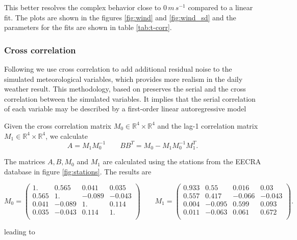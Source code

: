 \begin{refsection}
This better resolves the complex behavior close to $0\,\unit{m}\,\unit{s}^{-1}$ compared to a linear fit. The plots are shown in the figures \ref{fig:wind} and \ref{fig:wind_sd} and the parameters for the fits are shown in table \ref{tab:t-corr}.

\subsubsection{Cross correlation} \label{sec:corr}
Following \cite{Richardson1981} we use cross correlation to add additional residual noise to the simulated meteorological variables, which provides more realism in the daily weather result. This methodology, based on \cite{Matalas1967} preserves the serial and the cross correlation between the simulated variables. It implies that the serial correlation of each
variable may be described by a first-order linear autoregressive model

Given the cross correlation matrix $M_0\in\mathbb{R}^4\times\mathbb{R}^4$ and the lag-1 correlation matrix $M_1 \in\mathbb{R}^4\times\mathbb{R}^4$, we calculate 
\begin{equation}
A = M_1M_0^{-1} \qquad BB^T = M_0 - M_1M_0^{-1}M_1^T.
\end{equation}

The matrices $A, B, M_0$ and $M_1$ are calculated using the stations from the EECRA database in figure \ref{fig:stations}. The results are

\begin{equation}
M_0 = \left( \begin{matrix}
1. & 0.565 & 0.041 & 0.035\\
0.565 & 1. & -0.089 & -0.043\\
0.041 & -0.089 & 1. & 0.114\\
0.035 & -0.043 & 0.114 & 1.\\
\end{matrix} \right)
\qquad
M_1 = \left( \begin{matrix}
0.933 & 0.55 & 0.016 & 0.03\\
0.557 & 0.417 & -0.066 & -0.043\\
0.004 & -0.095 & 0.599 & 0.093\\
0.011 & -0.063 & 0.061 & 0.672\\
\end{matrix} \right).
\end{equation}

leading to


\end{refsection}
